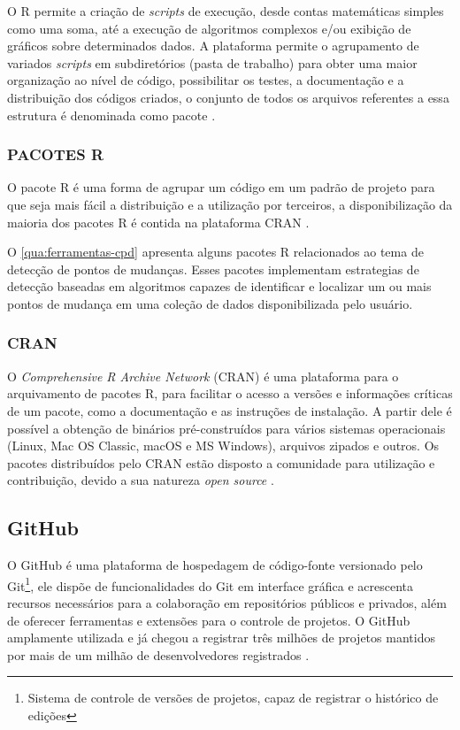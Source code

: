 O R permite a criação de \textit{scripts} de execução, desde contas matemáticas simples como uma soma, até a execução de algoritmos complexos e/ou exibição de gráficos sobre determinados dados. A plataforma permite o agrupamento de variados \textit{scripts} em subdiretórios (pasta de trabalho) para obter uma maior organização ao nível de código, possibilitar os testes, a documentação e a distribuição dos códigos criados, o conjunto de todos os arquivos referentes a essa estrutura é denominada como pacote \cite{website:Hornik2018}.

\subsubsection{PACOTES R}

O pacote R é uma forma de agrupar um código em um padrão de projeto para que seja mais fácil a distribuição e a utilização por terceiros, a disponibilização da maioria dos pacotes R é contida na plataforma CRAN \cite{website:Hornik2018}.

O \autoref{qua:ferramentas-cpd} apresenta alguns pacotes R relacionados ao tema de detecção de pontos de mudanças. Esses pacotes implementam estrategias de detecção baseadas em algoritmos capazes de identificar e localizar um ou mais pontos de mudança em uma coleção de dados disponibilizada pelo usuário.



\subsubsection{CRAN}

O \textit{Comprehensive R Archive Network} (CRAN) é uma plataforma para o arquivamento de pacotes R, para facilitar o acesso a versões e informações críticas de um pacote, como a documentação e as instruções de instalação. A partir dele é possível a obtenção de binários pré-construídos para vários sistemas operacionais (Linux, Mac OS Classic, macOS e MS Windows), arquivos zipados e outros. Os pacotes distribuídos pelo CRAN estão disposto a comunidade para utilização e contribuição, devido a sua natureza \textit{open source} \cite{website:Hornik2018}.

\subsection{GitHub}

O GitHub \cite{GitHub2019} é uma plataforma de hospedagem de código-fonte versionado pelo Git\footnote{Sistema de controle de versões de projetos, capaz de registrar o histórico de edições}, ele dispõe de funcionalidades do Git em interface gráfica e acrescenta recursos necessários para a colaboração em repositórios públicos e privados, além de oferecer ferramentas e extensões para o controle de projetos. O GitHub amplamente utilizada e já chegou a registrar três milhões de projetos mantidos por mais de um milhão de desenvolvedores registrados \cite{Thung2013}.

